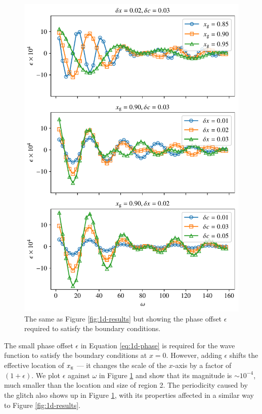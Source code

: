 \begin{figure}
    \centering
    \includegraphics{figures/glitch-1d-example-phase.pdf}
    \caption[The same as Figure \ref{fig:1d-results} but showing the phase offset required to satisfy the boundary conditions.]{The same as Figure \ref{fig:1d-results} but showing the phase offset \(\epsilon\) required to satisfy the boundary conditions.}
    \label{fig:1d-phase}
\end{figure}

The small phase offset \(\epsilon\) in Equation \ref{eq:1d-phase} is required for the wave function to satisfy the boundary conditions at \(x = 0\). However, adding \(\epsilon\) shifts the effective location of \(x_{{\mathrm{g}}}\) --- it changes the scale of the \(x\)-axis by a factor of \((1 + \epsilon)\). We plot \(\epsilon\) against \(\omega\) in Figure \ref{fig:1d-phase} and show that its magnitude is \(\sim 10^{-4}\), much smaller than the location and size of region 2. The periodicity caused by the glitch also shows up in Figure \ref{fig:1d-phase}, with its properties affected in a similar way to Figure \ref{fig:1d-results}.

